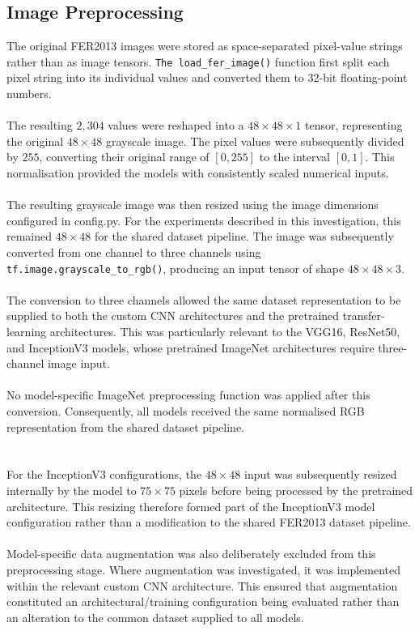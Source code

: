\documentclass[12pt, a4paper]{report}
\let\oldsubsection\subsection
\renewcommand{\subsection}{%
    \Needspace{6\baselineskip}%
    \oldsubsection
}
\begin{document}
			\subsection{Image Preprocessing}
				
				The original FER2013 images were stored as space-separated pixel-value strings rather than as image tensors. \texttt{The load\_fer\_image()} function first split each pixel string into its individual values and converted them to 32-bit floating-point numbers.\\\\
				The resulting $2,304$ values were reshaped into a $48\times48\times1$ tensor, representing the original $48\times48$ grayscale image. The pixel values were subsequently divided by $255$, converting their original range of $[0,255]$ to the interval $[0,1]$. This normalisation provided the models with consistently scaled numerical inputs.\\\\
				The resulting grayscale image was then resized using the image dimensions configured in config.py. For the experiments described in this investigation, this remained $48\times48$ for the shared dataset pipeline. The image was subsequently converted from one channel to three channels using \texttt{tf.image.grayscale\_to\_rgb()}, producing an input tensor of shape $48\times48\times3$.\\\\
				The conversion to three channels allowed the same dataset representation to be supplied to both the custom CNN architectures and the pretrained transfer-learning architectures. This was particularly relevant to the VGG16, ResNet50, and InceptionV3 models, whose pretrained ImageNet architectures require three-channel image input.\\\\
				No model-specific ImageNet preprocessing function was applied after this conversion. Consequently, all models received the same normalised RGB representation from the shared dataset pipeline.\\\\\\
				For the InceptionV3 configurations, the $48\times48$ input was subsequently resized internally by the model to $75\times75$ pixels before being processed by the pretrained architecture. This resizing therefore formed part of the InceptionV3 model configuration rather than a modification to the shared FER2013 dataset pipeline.\\\\
				Model-specific data augmentation was also deliberately excluded from this preprocessing stage. Where augmentation was investigated, it was implemented within the relevant custom CNN architecture. This ensured that augmentation constituted an architectural/training configuration being evaluated rather than an alteration to the common dataset supplied to all models.
				
\end{document}
